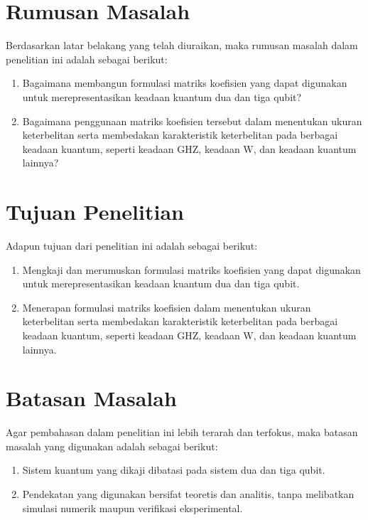 \section{Rumusan Masalah}
Berdasarkan latar belakang yang telah diuraikan, maka rumusan masalah dalam penelitian ini adalah sebagai berikut:
\begin{enumerate}
    \item Bagaimana membangun formulasi matriks koefisien yang dapat digunakan untuk merepresentasikan keadaan kuantum dua dan tiga qubit?
    \item Bagaimana penggunaan matriks koefisien tersebut dalam menentukan ukuran keterbelitan serta membedakan karakteristik keterbelitan pada berbagai keadaan kuantum, seperti keadaan GHZ, keadaan W, dan keadaan kuantum lainnya?
\end{enumerate}

\section{Tujuan Penelitian}
Adapun tujuan dari penelitian ini adalah sebagai berikut:
\begin{enumerate}
    \item Mengkaji dan merumuskan formulasi matriks koefisien yang dapat digunakan untuk merepresentasikan keadaan kuantum dua dan tiga qubit.
    \item Menerapan formulasi matriks koefisien dalam menentukan ukuran keterbelitan serta membedakan karakteristik keterbelitan pada berbagai keadaan kuantum, seperti keadaan GHZ, keadaan W, dan keadaan kuantum lainnya.
\end{enumerate}

\section{Batasan Masalah}
Agar pembahasan dalam penelitian ini lebih terarah dan terfokus, maka batasan masalah yang digunakan adalah sebagai berikut:
\begin{enumerate}
    \item Sistem kuantum yang dikaji dibatasi pada sistem dua dan tiga qubit.
    \item Pendekatan yang digunakan bersifat teoretis dan analitis, tanpa melibatkan simulasi numerik maupun verifikasi eksperimental.
\end{enumerate}

